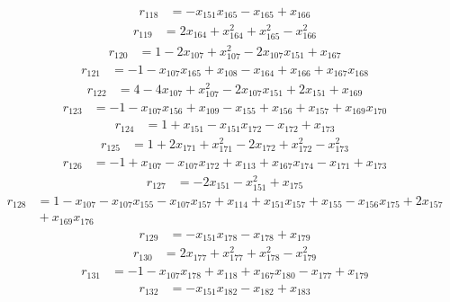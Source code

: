 \[\begin{aligned}
r_{118}&=-x_{151}x_{165}-x_{165}+x_{166}
\end{aligned}\]
\[\begin{aligned}
r_{119}&=2x_{164}+x_{164}^{2}+x_{165}^{2}-x_{166}^{2}
\end{aligned}\]
\[\begin{aligned}
r_{120}&=1-2x_{107}+x_{107}^{2}-2x_{107}x_{151}+x_{167}
\end{aligned}\]
\[\begin{aligned}
r_{121}&=-1-x_{107}x_{165}+x_{108}-x_{164}+x_{166}+x_{167}x_{168}
\end{aligned}\]
\[\begin{aligned}
r_{122}&=4-4x_{107}+x_{107}^{2}-2x_{107}x_{151}+2x_{151}+x_{169}
\end{aligned}\]
\[\begin{aligned}
r_{123}&=-1-x_{107}x_{156}+x_{109}-x_{155}+x_{156}+x_{157}+x_{169}x_{170}
\end{aligned}\]
\[\begin{aligned}
r_{124}&=1+x_{151}-x_{151}x_{172}-x_{172}+x_{173}
\end{aligned}\]
\[\begin{aligned}
r_{125}&=1+2x_{171}+x_{171}^{2}-2x_{172}+x_{172}^{2}-x_{173}^{2}
\end{aligned}\]
\[\begin{aligned}
r_{126}&=-1+x_{107}-x_{107}x_{172}+x_{113}+x_{167}x_{174}-x_{171}+x_{173}
\end{aligned}\]
\[\begin{aligned}
r_{127}&=-2x_{151}-x_{151}^{2}+x_{175}
\end{aligned}\]
\[\begin{aligned}
r_{128}&=1-x_{107}-x_{107}x_{155}-x_{107}x_{157}+x_{114}+x_{151}x_{157}+x_{155}-x_{156}x_{175}+2x_{157}\\
&{}+x_{169}x_{176}
\end{aligned}\]
\[\begin{aligned}
r_{129}&=-x_{151}x_{178}-x_{178}+x_{179}
\end{aligned}\]
\[\begin{aligned}
r_{130}&=2x_{177}+x_{177}^{2}+x_{178}^{2}-x_{179}^{2}
\end{aligned}\]
\[\begin{aligned}
r_{131}&=-1-x_{107}x_{178}+x_{118}+x_{167}x_{180}-x_{177}+x_{179}
\end{aligned}\]
\[\begin{aligned}
r_{132}&=-x_{151}x_{182}-x_{182}+x_{183}
\end{aligned}\]
